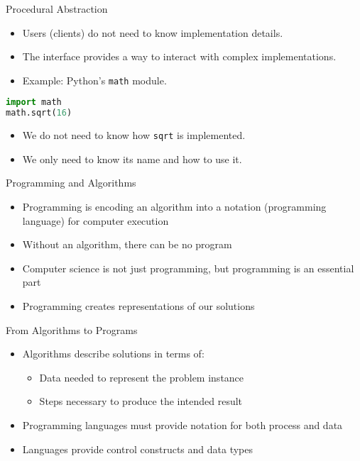 \begin{frame}[fragile]{Procedural Abstraction}
    \begin{itemize}
        \item Users (clients) do not need to know implementation details.
        \item The interface provides a way to interact with complex implementations.
        \item Example: Python's \texttt{math} module.
    \end{itemize}

    \vspace{0.5cm} %

    
    \begin{lstlisting}[style=colorful, language=Python]
import math
math.sqrt(16)
    \end{lstlisting}

    \vspace{0.5cm} %

    \begin{itemize}
        \item We do not need to know how \texttt{sqrt} is implemented.
        \item We only need to know its name and how to use it.
    \end{itemize}
\end{frame}

\begin{frame}{Programming and Algorithms}
    \begin{itemize}
        \item Programming is encoding an algorithm into a notation (programming language) for computer execution
        \item Without an algorithm, there can be no program
        \item Computer science is not just programming, but programming is an essential part
        \item Programming creates representations of our solutions
    \end{itemize}
\end{frame}

\begin{frame}{From Algorithms to Programs}
    \begin{itemize}
        \item Algorithms describe solutions in terms of:
        \begin{itemize}
            \item Data needed to represent the problem instance
            \item Steps necessary to produce the intended result
        \end{itemize}
        \item Programming languages must provide notation for both process and data
        \item Languages provide control constructs and data types
    \end{itemize}
\end{frame}

